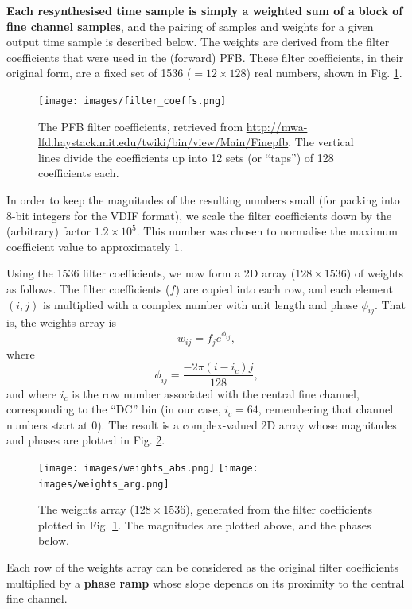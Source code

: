 \documentclass{article}
\begin{document}
{\bf Each resynthesised time sample is simply a weighted sum of a block of fine channel samples}, and the pairing of samples and weights for a given output time sample is described below.
The weights are derived from the filter coefficients that were used in the (forward) PFB.
These filter coefficients, in their original form, are a fixed set of 1536 ($= 12 \times 128$) real numbers, shown in Fig. \ref{fig:filter_coeffs}.
\begin{figure}[!ht]
    \centering
    \texttt{[image: images/filter\_coeffs.png]}
    \caption{The PFB filter coefficients, retrieved from \url{http://mwa-lfd.haystack.mit.edu/twiki/bin/view/Main/Finepfb}. The vertical lines divide the coefficients up into 12 sets (or ``taps'') of 128 coefficients each.}
    \label{fig:filter_coeffs}
\end{figure}
In order to keep the magnitudes of the resulting numbers small (for packing into 8-bit integers for the VDIF format), we scale the filter coefficients down by the (arbitrary) factor $1.2 \times 10^{5}$.
This number was chosen to normalise the maximum coefficient value to approximately $1$.

Using the 1536 filter coefficients, we now form a 2D array ($128 \times 1536$) of weights as follows.
The filter coefficients ($f$) are copied into each row, and each element $(i,j)$ is multiplied with a complex number with unit length and phase $\phi_{ij}$.
That is, the weights array is
\begin{equation}
    w_{ij} = f_j e^{\phi_{ij}},
\end{equation}
where
\begin{equation}
    \phi_{ij} = \frac{-2\pi(i-i_c)j}{128},
\end{equation}
and where $i_c$ is the row number associated with the central fine channel, corresponding to the ``DC'' bin (in our case, $i_c = 64$, remembering that channel numbers start at $0$).
The result is a complex-valued 2D array whose magnitudes and phases are plotted in Fig. \ref{fig:weights}.
\begin{figure}[!b]
    \centering
    \texttt{[image: images/weights\_abs.png]}
    \texttt{[image: images/weights\_arg.png]}
    \caption{The weights array ($128 \times 1536$), generated from the filter coefficients plotted in Fig. \ref{fig:filter_coeffs}. The magnitudes are plotted above, and the phases below.}
    \label{fig:weights}
\end{figure}
Each row of the weights array can be considered as the original filter coefficients multiplied by a {\bf phase ramp} whose slope depends on its proximity to the central fine channel.
\end{document}
